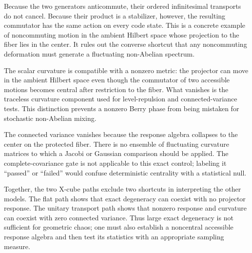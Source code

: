Because the two generators anticommute, their ordered infinitesimal
transports do not cancel.  Because their product is a stabilizer, however,
the resulting commutator has the same action on every code state.  This is a
concrete example of noncommuting motion in the ambient Hilbert space whose
projection to the fiber lies in the center.  It rules out the converse
shortcut that any noncommuting deformation must generate a fluctuating
non-Abelian spectrum.

The scalar curvature is compatible with a nonzero metric: the projector can
move in the ambient Hilbert space even though the commutator of two accessible
motions becomes central after restriction to the fiber.  What vanishes is the
traceless curvature component used for level-repulsion and connected-variance
tests.  This distinction prevents a nonzero Berry phase from being mistaken
for stochastic non-Abelian mixing.

The connected variance vanishes because the response algebra collapses to
the center on the protected fiber.  There is no ensemble of fluctuating
curvature matrices to which a Jacobi or Gaussian comparison should be
applied.  The complete-covariance gate is not applicable to this exact
control; labeling it ``passed'' or ``failed'' would confuse deterministic
centrality with a statistical null.

Together, the two X-cube paths exclude two shortcuts in interpreting the
other models.  The flat path shows that exact degeneracy can coexist with no
projector response.  The unitary transport path shows that nonzero response
and curvature can coexist with zero connected variance.  Thus large exact
degeneracy is not sufficient for geometric chaos; one must also establish a
noncentral accessible response algebra and then test its statistics with an
appropriate sampling measure.
